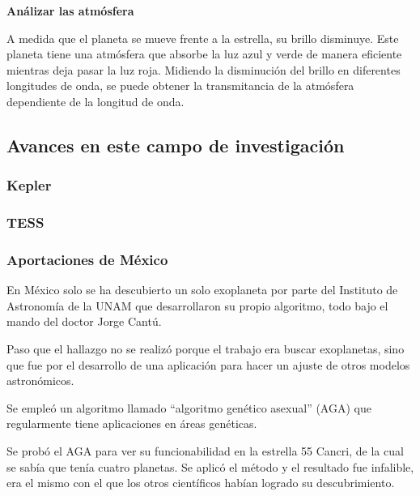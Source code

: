 \documentclass[fleqn, journal]{IEEEtran}                        %
\theoremstyle{break}                                            %
\begin{document}
                \vspace{1em}
                \textbf{Análizar las atmósfera}

                A medida que el planeta se mueve frente a la estrella, su brillo disminuye. 
                Este planeta tiene una atmósfera que absorbe la luz azul y verde de manera eficiente
                mientras deja pasar la luz roja. Midiendo la disminución del brillo en diferentes longitudes 
                de onda, se puede obtener la transmitancia de la atmósfera dependiente de la longitud de onda.

        
        \vspace{1em}
        \subsection{Avances en este campo de investigación}
        
            \vspace{1em}
            \subsubsection{Kepler}

            \vspace{1em}
            \subsubsection{TESS}

            \vspace{1em}
            \subsubsection{Aportaciones de México}

                En México solo se ha descubierto un solo exoplaneta por parte del Instituto de Astronomía de la UNAM
                que desarrollaron su propio algoritmo, todo bajo el mando del doctor Jorge Cantú.

                Paso que el hallazgo no se realizó porque el trabajo era buscar exoplanetas, sino que fue por
                el desarrollo de una aplicación para hacer un ajuste de otros modelos astronómicos.

                Se empleó un algoritmo llamado “algoritmo genético asexual” (AGA) que regularmente tiene aplicaciones
                en áreas genéticas.

                Se probó el AGA para ver su funcionabilidad en la estrella 55 Cancri,
                de la cual se sabía que tenía cuatro planetas. Se aplicó el método y el resultado fue
                infalible, era el mismo con el que los otros científicos habían logrado su descubrimiento.
\end{document}

